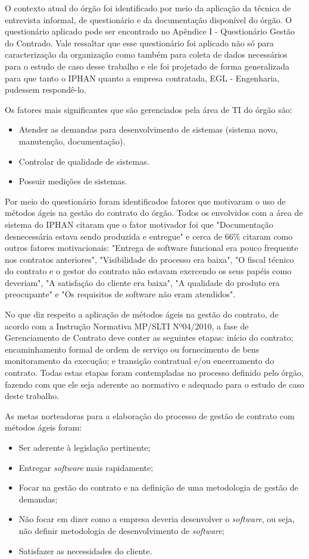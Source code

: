 O contexto atual do órgão foi identificado por meio da aplicação da técnica de entrevista informal, de questionário e da documentação disponível do órgão. O questionário aplicado pode ser encontrado no Apêndice I - Questionário Gestão do Contrado. Vale ressaltar que esse questionário foi aplicado não só para caracterização da organização como também para coleta de dados necessários para o estudo de caso desse trabalho e ele foi projetado de forma generalizada para que tanto o IPHAN quanto a empresa contratada, EGL - Engenharia, pudessem respondê-lo.
 
Os fatores mais significantes que são gerenciados pela área de TI do órgão são:
\begin{itemize}
\item Atender as demandas para desenvolvimento de sistemas (sistema novo, manutenção, documentação).
\item Controlar de qualidade de sistemas.
\item Possuir medições de sistemas.
\end{itemize}

Por meio do questionário foram identificados fatores que motivaram o uso de métodos ágeis na gestão do contrato do órgão. Todos os envolvidos com a área de sistema do IPHAN citaram que o fator motivador foi que "Documentação desnecessária estava sendo produzida e entregue"  e cerca de 66\%  citaram como outros fatores motivacionais: "Entrega de software funcional era pouco frequente nos contratos anteriores", "Visibilidade do processo era baixa", "O fiscal técnico do contrato e o gestor do contrato não estavam exercendo os seus papéis como deveriam", "A satisfação do cliente era baixa", "A qualidade do produto era preocupante" e "Os requisitos de software não eram atendidos".

No que diz respeito a aplicação de métodos ágeis na gestão do contrato, de acordo com a Instrução Normativa MP/SLTI Nº04/2010, a fase de Gerenciamento de Contrato deve conter as seguintes etapas: início do contrato; encaminhamento formal de ordem de serviço ou fornecimento de bens  monitoramento da execução; e transição contratual e/ou encerramento do contrato. Todas estas etapas foram contempladas no processo definido pelo órgão, fazendo com que ele seja aderente ao normativo e adequado para o estudo de caso deste trabalho.

As metas norteadoras para a elaboração do processo de gestão de contrato com métodos ágeis foram:
\begin{itemize}
\item Ser aderente à legislação pertinente;
\item Entregar \textit{software} mais rapidamente;
\item Focar na gestão do contrato e na definição de uma metodologia de gestão de demandas;
\item Não focar em dizer como a empresa deveria desenvolver o \textit{software}, ou seja, não definir metodologia de desenvolvimento de \textit{software};
\item Satisfazer as necessidades do cliente.
\end{itemize}

